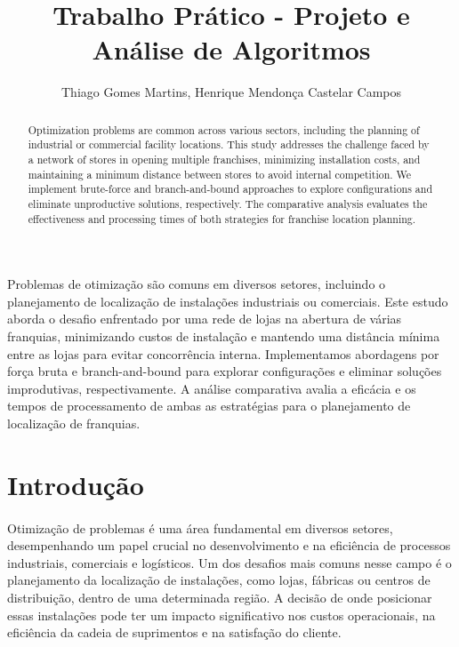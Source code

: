 \documentclass[12pt]{article}
\title{Trabalho Prático - Projeto e Análise de Algoritmos}
\author{Thiago Gomes Martins, Henrique Mendonça Castelar Campos}
\begin{document}
 

\maketitle

\begin{abstract}
  Optimization problems are common across various sectors, including the planning of industrial or commercial facility locations. This study addresses the challenge faced by a network of stores in opening multiple franchises, minimizing installation costs, and maintaining a minimum distance between stores to avoid internal competition. We implement brute-force and branch-and-bound approaches to explore configurations and eliminate unproductive solutions, respectively. The comparative analysis evaluates the effectiveness and processing times of both strategies for franchise location planning.
\end{abstract}
     
\begin{resumo} 
  Problemas de otimização são comuns em diversos setores, incluindo o planejamento de localização de instalações industriais ou comerciais. Este estudo aborda o desafio enfrentado por uma rede de lojas na abertura de várias franquias, minimizando custos de instalação e mantendo uma distância mínima entre as lojas para evitar concorrência interna. Implementamos abordagens por força bruta e branch-and-bound para explorar configurações e eliminar soluções improdutivas, respectivamente. A análise comparativa avalia a eficácia e os tempos de processamento de ambas as estratégias para o planejamento de localização de franquias.
\end{resumo}


\section{Introdução}

\paragraph{}Otimização de problemas é uma área fundamental em diversos setores, desempenhando um papel crucial no desenvolvimento e na eficiência de processos industriais, comerciais e logísticos. Um dos desafios mais comuns nesse campo é o planejamento da localização de instalações, como lojas, fábricas ou centros de distribuição, dentro de uma determinada região. A decisão de onde posicionar essas instalações pode ter um impacto significativo nos custos operacionais, na eficiência da cadeia de suprimentos e na satisfação do cliente.
\end{document}
